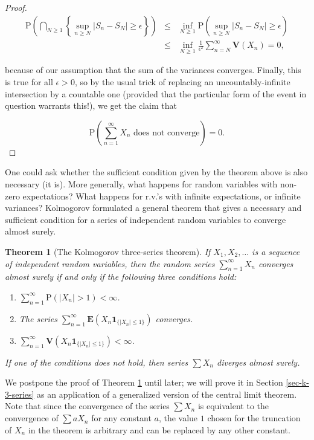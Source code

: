 \documentclass[11pt]{report}
\theoremstyle{plain}
\newtheorem{thm}{Theorem}[chapter]
\theoremstyle{definition}
\begin{document}
\begin{proof}
\begin{eqnarray*}
\mathrm{P}\left( \bigcap_{N\ge 1} \left\{
\sup_{n\ge N}
|S_n-S_N|\ge\epsilon
\right\} \right) &\le& \inf_{N\ge 1}
\mathrm{P}\left(
\sup_{n\ge N}
|S_n-S_N|\ge\epsilon
\right) \\ &\le&
\inf_{N\ge 1} \frac{1}{\epsilon^2} \sum_{n=N}^\infty \mathbf{V}(X_n) = 0,
\end{eqnarray*}

because of our assumption that the sum of the
variances converges. Finally, this is true for all
$\epsilon>0$, so by the usual trick of replacing an
uncountably-infinite intersection by a countable one
(provided that the particular form of the event in
question warrants this!), we get the claim that

\[
\mathrm{P}\left(\sum_{n=1}^\infty X_n\textrm{ does not converge}\right) = 0.
\]

\end{proof}

One could ask whether the sufficient condition given
by the theorem above is also necessary (it is). More
generally, what happens for random variables with
non-zero expectations? What happens for r.v.'s with
infinite expectations, or infinite variances?
Kolmogorov formulated a general theorem that gives a
necessary and sufficient condition for a series of
independent random variables to converge almost
surely.

\begin{thm}[The Kolmogorov three-series theorem]
\label{thm-three-series}
If $X_1,X_2,\ldots$ is a sequence of independent
random variables, then the random series
$\sum_{n=1}^\infty X_n$ converges almost surely if
and only if the following three conditions hold:

\begin{enumerate}[label=\arabic*.]
\item $\sum_{n=1}^\infty \mathrm{P}(|X_n|>1) < \infty$.

\item The series
$\sum_{n=1}^\infty \mathbf{E}(X_n
\mathbf{1}_{\{|X_n|\le 1\}})$
converges.

\item $\sum_{n=1}^\infty \mathbf{V}(X_n \mathbf{1}_{\{|X_n|
\le 1\}}) < \infty$.
\end{enumerate}

If one of the conditions does not hold, then series
$\sum X_n$ diverges almost surely.
\end{thm}

We postpone the proof of Theorem \ref{thm-three-series}
until later; we will prove it in Section
\ref{sec-k-3-series} as an application of a generalized
version of the central limit theorem. Note that since
the convergence of the series $\sum X_n$ is
equivalent to the convergence of $\sum a X_n$ for any
constant $a$, the value $1$ chosen for the truncation
of $X_n$ in the theorem is arbitrary and can be
replaced by any other constant.
\end{document}
